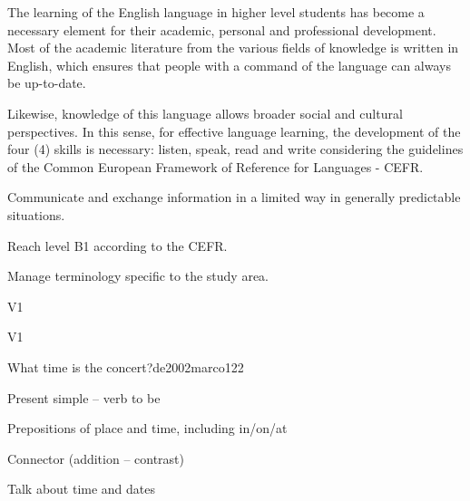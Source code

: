\begin{syllabus}


\begin{justification}
The learning of the English language in higher level students has become a necessary element 
for their academic, personal and professional development. 
Most of the academic literature from the various fields of knowledge is written in English, 
which ensures that people with a command of the language can always be up-to-date. 

Likewise, knowledge of this language allows broader social and cultural perspectives. 
In this sense, for effective language learning, the development of the four (4) skills is necessary: 
listen, speak, read and write considering the guidelines of the 
Common European Framework of Reference for Languages - CEFR.
\end{justification}

\begin{goals}
\item Communicate and exchange information in a limited way in generally predictable situations.
\item Reach level B1 according to the CEFR.
\item Manage terminology specific to the study area.
\end{goals}

\begin{outcomes}{V1}
\item {}
\end{outcomes}

\begin{competences}{V1}
 \item {}
\end{competences}

\begin{unit}{What time is the concert?}{}{de2002marco}{12}{2}
   \begin{topics}
      \item Present simple – verb to be
      \item Prepositions of place and time, including in/on/at
      \item Connector (addition – contrast)
   \end{topics}

   \begin{learningoutcomes}
      \item Talk about time and dates
   \end{learningoutcomes}


\end{unit}
\end{syllabus}

